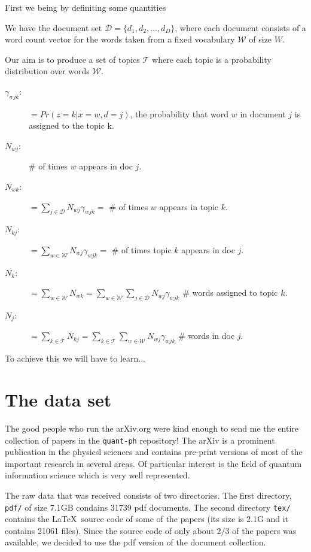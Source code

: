 \documentclass[11pt]{article}
\newcommand{\file}[1]{\texttt{#1}}
\newcommand{\DD}{\mathcal{D}}
\newcommand{\WW}{\mathcal{W}}
\newcommand{\TT}{\mathcal{T}}
\begin{document}
    First we being by definiting some quantities
    
    We have the document set $\DD = \{ d_1, d_2, \ldots, d_D \}$, where each document consists of 
    a word count vector for the words taken from a fixed vocabulary $\WW$ of size $W$.
    
    Our aim is to produce a set of topics $\TT$ where each topic is a probability distribution over words $\WW$.
    
    
    \begin{description}
	\item[$\gamma_{wjk}$:]	$=Pr( z=k | x=w,d=j)$, the probability that word $w$ in document $j$ 
						is assigned to the topic k.
	\item[$N_{wj}$:]	\# of times $w$ appears in doc $j$. 
	\item[$N_{wk}$:]  $=\displaystyle\sum_{j\in \DD} N_{wj}\gamma_{wjk} = $ \# of times $w$ appears in topic $k$.
	\item[$N_{kj}$:]  $=\displaystyle\sum_{w\in \WW} N_{wj}\gamma_{wjk} = $ \# of times topic $k$ appears in doc $j$.
	\item[$N_{k}$:]  $=\displaystyle\sum_{w\in \WW} N_{wk}=  \displaystyle\sum_{w\in \WW}\sum_{j\in \DD} N_{wj}\gamma_{wjk} $ \# words assigned to  topic $k$.
	\item[$N_{j}$: ]  $=\displaystyle\sum_{k \in \TT} N_{kj} =  \displaystyle\sum_{k \in \TT}\sum_{w\in \WW}N_{wj}\gamma_{wjk} $ \# words in doc $j$.
    \end{description}


    To achieve this we will have to learn...


\section{The data set} \label{section:data-set}

	The good people who run the arXiv.org were kind enough to send me the entire collection of papers
	in the \texttt{quant-ph} repository! 
    The arXiv is a prominent publication in the physicsl sciences and contains pre-print versions
    of most of the important research in several areas.
    Of particular interest is the field of quantum information science which is very well
    represented.
	
    The raw data that was received consists of two directories. 
    The first directory, \file{pdf/} of size 7.1GB condains 31739 pdf documents.
    The second directory \file{tex/}  contains the \LaTeX \ source code of some of the papers 
    (its size is 2.1G and it contains 21061 files). 
    Since the source code of only about $2/3$ of the papers was available, we decided to use 
    the pdf version of the document collection.
\end{document}

